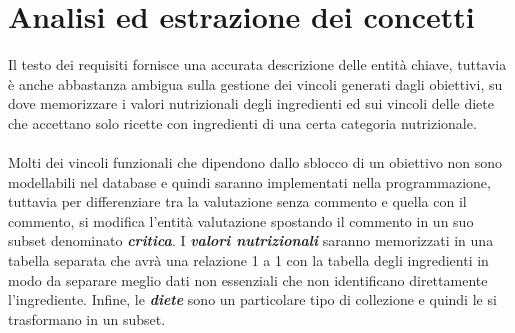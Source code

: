 ﻿\documentclass[a4paper,12pt]{report}
\begin{document}
\section{Analisi ed estrazione dei concetti}
Il testo dei requisiti fornisce una accurata descrizione delle entità chiave, tuttavia è anche abbastanza ambigua sulla gestione dei vincoli generati dagli obiettivi, su dove memorizzare i valori nutrizionali degli ingredienti ed sui vincoli delle diete che accettano solo ricette con ingredienti di una certa categoria nutrizionale.
\\\\
Molti dei vincoli funzionali che dipendono dallo sblocco di un obiettivo non sono modellabili nel database e quindi saranno implementati nella programmazione, tuttavia per differenziare tra la valutazione senza commento e quella con il commento, si modifica l'entità valutazione spostando il commento in un suo subset denominato \textbf{\textit{critica}}. I \textbf{\textit{valori nutrizionali}} saranno memorizzati in una tabella separata che avrà una relazione 1 a 1 con la tabella degli ingredienti in modo da separare meglio dati non essenziali che non identificano direttamente l'ingrediente. Infine, le \textbf{\textit{diete}} sono un particolare tipo di collezione e quindi le si trasformano in un subset.
\end{document}
